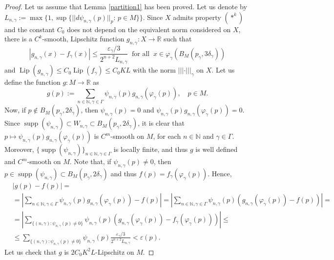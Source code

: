 \documentclass[11pt]{amsart}
\numberwithin{equation}{section}
\begin{document}
\begin{proof}
Let us assume that  Lemma \ref{partition1} has been proved.  Let us denote by $L_{n,\gamma}:=
\max\{1,\sup\{||d\psi_{n,\gamma}(p)||_p: \, {p\in M}\}\}$. Since $X$ admits property $(*^k)$ and the constant $C_0$ does not depend
on the equivalent norm considered on $X$,  there is a $C^k$-smooth, Lipschitz function
$g_{n,\gamma}:X\to {\mathbb{R}}$ such that
\begin{equation*}
|g_{n,\gamma}(x)-{f}_{\gamma}(x)|\le \frac{\varepsilon_\gamma/3}{2^{n+2} L_{n,\gamma}} \ \text{ for all }\ x\in
 \varphi_\gamma(B_M(p_\gamma,3\delta_\gamma))
\end{equation*}
and ${\operatorname{Lip}}(g_{n,\gamma})\le C_0 {\operatorname{Lip}}({f}_{\gamma})\le  C_0 K L$ with the norm $|||\cdot|||_\gamma$ on $X$.
Let us define the function $g:M\to {\mathbb{R}}$ as
\begin{equation*}
g(p):=\sum_{n\in\mathbb{N}, \gamma\in \Gamma} \psi_{n,\gamma}(p)g_{n,\gamma}(\varphi_{\gamma}(p)),
\quad  p\in M.
\end{equation*}
Now, if $p\not\in B_M(p_\gamma, 2\delta_\gamma)$, then $\psi_{n,\gamma}(p)=0$ and $\psi_{n,\gamma}(p)g_{n,\gamma}(\varphi_{\gamma}(p))=0$. Since  ${\operatorname{supp}} (\psi_{n,\gamma})\subset W_{n,\gamma}\subset B_M(p_\gamma,2\delta_\gamma)$,
it is clear that $p\mapsto \psi_{n,\gamma}(p)g_{n,\gamma}(\varphi_{\gamma}(p))$ is $C^m$-smooth on $M$, for each $n\in\mathbb{N}$ and $\gamma\in \Gamma$.
 Moreover, $\{{\operatorname{supp}} (\psi_{n,\gamma})\}_{n\in \mathbb N, \gamma \in \Gamma}$ is locally finite,
    and thus $g$ is well defined and  $C^m$-smooth on $M$. \newline
Note that, if $\psi_{n,\gamma}(p)\neq 0$, then $p\in {\operatorname{supp}} (\psi_{n,\gamma})\subset B_M(p_\gamma,2\delta_\gamma)$ and thus $f(p)={f}_\gamma(\varphi_\gamma(p))$. Hence,
\begin{align*}
 &|g(p)-f(p)|=&\\
 & =|\sum_{n\in\mathbb{N},\gamma\in \Gamma} \psi_{n,\gamma}(p)g_{n,\gamma}(\varphi_{\gamma}(p))-f(p)|= |\sum_{n\in\mathbb{N},\gamma\in \Gamma} \psi_{n,\gamma}(p)(g_{n,\gamma}(\varphi_{\gamma}(p))-f(p))|  =&\\
&= |\sum_{\{(n,\gamma) : \psi_{n,\gamma}(p)\neq0 \}} \psi_{n,\gamma}(p)(g_{n,\gamma}(\varphi_{\gamma}(p))-{f}_\gamma(\varphi_{\gamma}(p)))| \le  &\\
& \le \sum_{\{(n,\gamma) : \psi_{n,\gamma}(p)\neq0 \}} \psi_{n,\gamma}(p)  \frac{\varepsilon_\gamma/3}{2^{n+2}  L_{n,\gamma}}<\varepsilon(p).&
\end{align*}
Let us check that $g$ is  $2C_0 K^2 L$-Lipschitz on $M$.

\end{proof}
\end{document}
